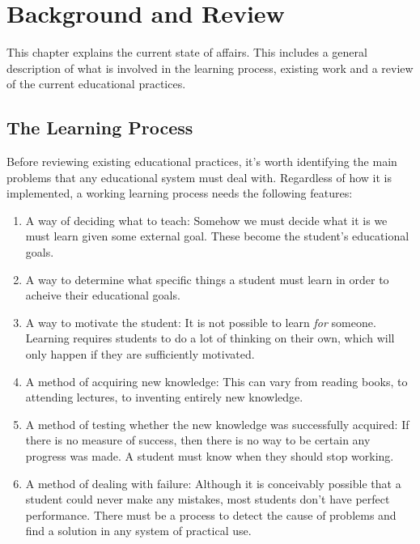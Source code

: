 \chapter{Background and Review}
\label{chapter:background}
  This chapter explains the current state of affairs. This includes a general description of what is involved in the learning process, existing work and a review of the current educational practices.

  \section{The Learning Process}
    \label{section:learning_process}
    Before reviewing existing educational practices, it's worth identifying the main problems that any educational system must deal with. Regardless of how it is implemented, a working learning process needs the following features:

    \begin{enumerate}
      \item A way of deciding what to teach: Somehow we must decide what it is we must learn given some external goal. These become the student's educational goals.

      \item A way to determine what specific things a student must learn in order to acheive their educational goals.

      \item A way to motivate the student: It is not possible to learn \emph{for} someone. Learning requires students to do a lot of thinking on their own, which will only happen if they are sufficiently motivated.

      \item A method of acquiring new knowledge: This can vary from reading books, to attending lectures, to inventing entirely new knowledge.

      \item A method of testing whether the new knowledge was successfully acquired: If there is no measure of success, then there is no way to be certain any progress was made. A student must know when they should stop working.

      \item A method of dealing with failure: Although it is conceivably possible that a student could never make any mistakes, most students don't have perfect performance. There must be a process to detect the cause of problems and find a solution in any system of practical use.
    \end{enumerate}

